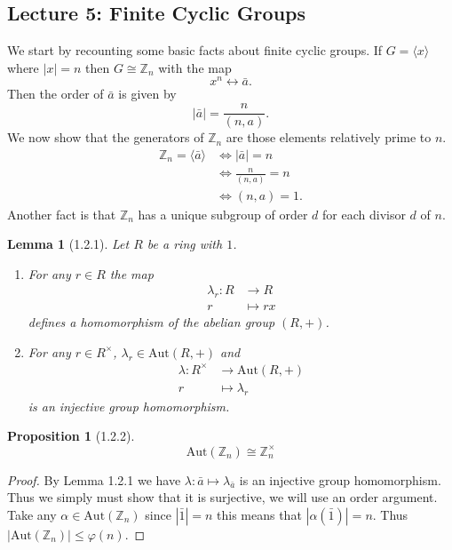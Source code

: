 \documentclass[11pt,leqno,oneside]{amsart}
\newcommand{\Z}{{\mathbb Z}} %
\newcommand{\isom}{\mathrel{\cong}}
\newcommand{\Aut}{\text{Aut}}
\newtheorem*{lem*}{Lemma}
\newtheorem*{prop*}{Proposition}
\theoremstyle{definition}
\numberwithin{equation}{section}
\begin{document}
\subsection*{Lecture 5: Finite Cyclic Groups}
We start by recounting some basic facts about finite cyclic groups. If
\(G=\langle x\rangle\) where \(|x|=n\) then \(G \isom \Z_n\) with the map
\[x^n \longleftrightarrow \bar{a}.\] Then the order of \(\bar{a}\) is given by
\[|\bar{a}|=\frac{n}{(n,a)}.\] We now show that the generators of \(\Z_n\) are
those elements relatively prime to \(n\).
\begin{align*}
  \Z_n = \langle \bar{a} \rangle &\iff |\bar{a}|=n\\
                                 &\iff \frac{n}{(n,a)}=n\\
                                 &\iff (n,a)=1.
\end{align*}
Another fact is that \(\Z_n\) has a unique subgroup of order \(d\) for each
divisor \(d\) of \(n\).
\begin{lem*}[1.2.1] Let \(R\) be a ring with \(1\).
  \begin{enumerate}
  \item[(a)] For any \(r \in R\) the map
    \begin{align*}
      \lambda_r \colon R &\to R\\
      r &\mapsto rx
    \end{align*}
    defines a homomorphism of the abelian group \((R,+)\).
  \item[(b)] For any \(r \in R^\times\), \(\lambda_r \in \Aut(R,+)\) and
    \begin{align*}
      \lambda \colon R^\times &\to \Aut(R,+)\\
      r &\mapsto \lambda_r
    \end{align*}
    is an injective group homomorphism.
  \end{enumerate}
      
\end{lem*}
\begin{prop*}[1.2.2]
  \[\Aut(\Z_n) \isom \Z_n^\times\]
\end{prop*}
\begin{proof}
  By Lemma 1.2.1 we have \(\lambda \colon \bar{a} \mapsto \lambda_{\bar{a}}\) is
  an injective group homomorphism. Thus we simply must show that it is
  surjective, we will use an order argument. Take any \(\alpha \in \Aut(\Z_n)\)
  since \(|\bar{1}|=n\) this means that \(|\alpha(\bar{1})|=n\). Thus
  \(|\Aut(\Z_n)| \le \varphi(n)\).
\end{proof}
\end{document}
